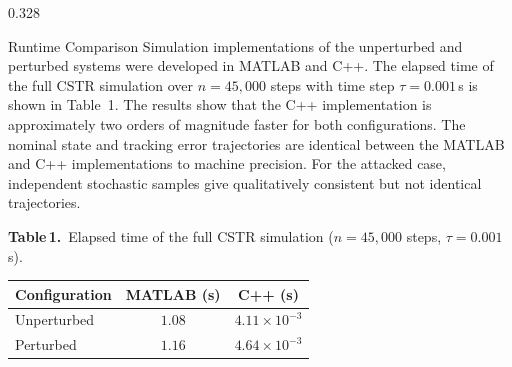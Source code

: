 \documentclass[final]{beamer}
\newlength{\rowBh}          \setlength{\rowBh}{52.1cm}
\newlength{\innergap}       \setlength{\innergap}{0.55cm}
\begin{document}
\begin{frame}[t]
\begin{center}
\begin{minipage}{0.975\textwidth}
\begin{minipage}[t][\rowBh]{\linewidth}
\begin{columns}[T,totalwidth=\linewidth]
\begin{column}{0.328\linewidth}
\begin{minipage}[t][\rowBh][t]{\linewidth}
\begin{posterpanel}[height=0.395\rowBh]{Runtime Comparison}
								Simulation implementations of the unperturbed and perturbed
								systems were developed in MATLAB and C++. The elapsed time
								of the full CSTR simulation over $n=45{,}000$ steps with
								time step $\tau=0.001$\,s is shown in Table~1. The results show that
								the C++ implementation is approximately two orders of magnitude
								faster for both configurations. The nominal state and tracking
								error trajectories are identical between the MATLAB and C++
								implementations to machine precision. For the attacked case,
								independent stochastic samples give qualitatively consistent
								but not identical trajectories.


								\vspace{\innergap}

								\centering
								\posterfigcapfont
								\textbf{Table\,1.}~Elapsed time of the full CSTR simulation
								($n=45{,}000$ steps, $\tau=0.001$\,s).\par
								\vspace{0.22cm}
								\begin{tabular}{lcc}
									\toprule
									Configuration & MATLAB (s) & C++ (s)             \\
									\midrule
									Unperturbed   & $1.08$     & $4.11\times10^{-3}$ \\
									Perturbed     & $1.16$     & $4.64\times10^{-3}$ \\
									\bottomrule
								\end{tabular}\par
								\vspace{0.38cm}
							\end{posterpanel}

							\vspace{\innergap}


\end{minipage}
\end{column}
\end{columns}
\end{minipage}
\end{minipage}
\end{center}
\end{frame}
\end{document}
